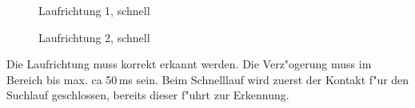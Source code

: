 \documentclass[ngerman,11pt,parskip=half] {scrartcl}
\newcommand {\tscopesize}{12cm}
\begin{document}
\begin{figure}[H]
\centering
{}
\caption{Laufrichtung 1, schnell} \label{fig:1}
\end{figure}

\begin{figure}[H]
\centering
{}
\caption{Laufrichtung 2, schnell} \label{fig:1}
\end{figure}

Die Laufrichtung muss korrekt erkannt werden. Die Verz"ogerung muss im Bereich bis max. ca 50\,ms sein. Beim Schnelllauf wird zuerst der Kontakt f"ur den Suchlauf geschlossen, bereits dieser f"uhrt zur Erkennung.
\end{document}
